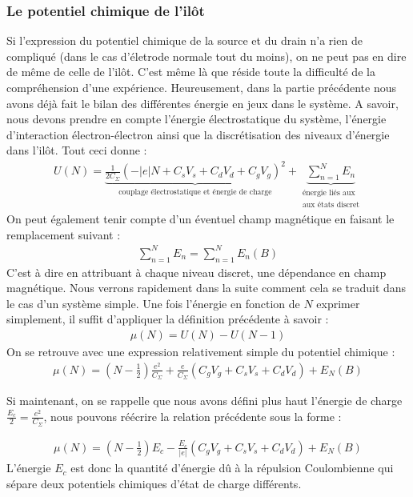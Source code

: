 \subsubsection{Le potentiel chimique de l'il\^ot}
Si l'expression du potentiel chimique de la source et du drain n'a rien de compliqué (dans le cas d'életrode normale tout du moins), on ne peut pas en dire de m\^eme de celle de l'il\^ot. C'est m\^eme là que réside toute la difficulté de la compréhension d'une expérience. Heureusement, dans la partie précédente nous avons déjà fait le bilan des différentes énergie en jeux dans le système. A savoir, nous devons prendre en compte l'énergie électrostatique du système, l'énergie d'interaction électron-électron ainsi que la discrétisation des niveaux d'énergie dans l'il\^ot. Tout ceci donne :
\begin{eqnarray}
U(N) = \underbrace{\frac{1}{2C_{\Sigma}} (-|e|N + C_sV_s + C_dV_d + C_gV_g)^2}_{\text{couplage électrostatique et énergie de charge}}
+ 
\underbrace{\sum_{n=1}^{N} E_n}_{\substack{\text{énergie liés aux} \\\text{aux états discret}}}
\end{eqnarray}
On peut également tenir compte d'un éventuel champ magnétique en faisant le remplacement suivant :
\begin{eqnarray}
\sum_{n=1}^N E_n = \sum_{n=1}^N E_n(B) \nonumber
\end{eqnarray}
C'est à dire en attribuant à chaque niveau discret, une dépendance en champ magnétique. Nous verrons rapidement dans la suite comment cela se traduit dans le cas d'un système simple. Une fois l'énergie en fonction de $N$ exprimer simplement, il suffit d'appliquer la définition précédente à savoir :
\begin{eqnarray}
\mu(N) = U(N) - U(N-1) \nonumber
\end{eqnarray}
On se retrouve avec une expression relativement simple du potentiel chimique :
\begin{eqnarray}
\mu(N) = (N-\frac{1}{2})\frac{e^2}{C_{\Sigma}}
+ 
\frac{e}{C_{\Sigma}}(C_gV_g + C_sV_s + C_dV_d)
+
E_N(B)
\end{eqnarray}

Si maintenant, on se rappelle que nous avons défini plus haut l'énergie de charge $\frac{E_c}{2} = \frac{e^2}{C_{\Sigma}}$, nous pouvons réécrire la relation précédente sous la forme :

\begin{eqnarray}
\mu(N) = (N-\frac{1}{2})E_c
- 
\frac{E_c}{|e|}(C_gV_g + C_sV_s + C_dV_d)
+
E_N(B)
\label{pot_chim}
\end{eqnarray}
L'énergie $E_c$ est donc la quantité d'énergie d\^u à la répulsion Coulombienne qui sépare deux potentiels chimiques d'état de charge différents.


